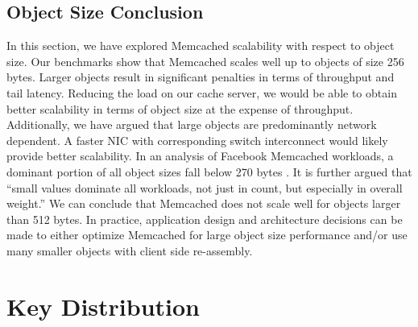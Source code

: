 \subsection{Object Size Conclusion}
In this section, we have explored Memcached scalability with respect to object size. Our benchmarks show that Memcached scales well up to objects of size 256 bytes. Larger objects result in significant penalties in terms of throughput and tail latency. Reducing the load on our cache server, we would be able to obtain better scalability in terms of object size at the expense of throughput. Additionally, we have argued that large objects are predominantly network dependent. A faster NIC with corresponding switch interconnect would likely provide better scalability. In an analysis of Facebook Memcached workloads, a dominant portion of all object sizes fall below 270 bytes \cite{atikoglu2012workload}. It is further argued that ``small values dominate all workloads, not just in count, but especially in overall weight.'' \cite{atikoglu2012workload} We can conclude that Memcached does not scale well for objects larger than 512 bytes. In practice, application design and architecture decisions can be made to either optimize Memcached for large object size performance and/or use many smaller objects with client side re-assembly.


\section{Key Distribution}



